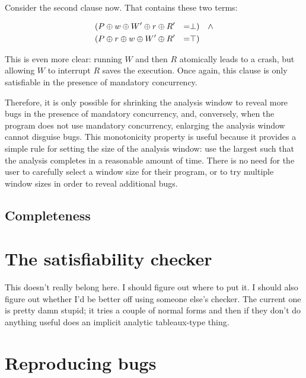 Consider the second clause now.
That contains these two terms:

\begin{align*}
  & (P \oplus w \oplus W' \oplus r \oplus R' & = & \bot) & \wedge \\
  & (P \oplus r \oplus w \oplus W' \oplus R' & = & \top)
\end{align*}

This is even more clear: running $W$ and then $R$ atomically leads to a crash, but allowing $W$ to interrupt $R$ saves the execution.
Once again, this clause is only satisfiable in the presence of mandatory concurrency.

Therefore, it is only possible for shrinking the analysis window to reveal more bugs in the presence of mandatory concurrency, and, conversely, when the program does not use mandatory concurrency, enlarging the analysis window cannot disguise bugs.
This monotonicity property is useful because it provides a simple rule for setting the size of the analysis window: use the largest such that the analysis completes in a reasonable amount of time.
There is no need for the user to carefully select a window size for their program, or to try multiple window sizes in order to reveal additional bugs.




\subsection{Completeness}

\section{The satisfiability checker}
This doesn't really belong here.  I should figure out where to put it.
I should also figure out whether I'd be better off using someone
else's checker.  The current one is pretty damn stupid; it tries a
couple of normal forms and then if they don't do anything useful does
an implicit analytic tableaux-type thing.

\section{Reproducing bugs}
\label{sect:reproducing_bugs}

